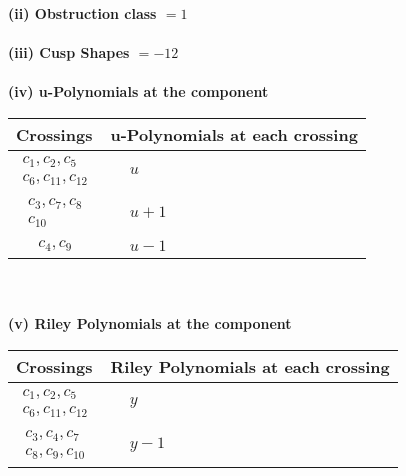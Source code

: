 \documentclass[1p]{elsarticle_modified}
\theoremstyle{definition}
\begin{document}
\flushleft \textbf{(ii) Obstruction class $= 1$}\\~\\
\flushleft \textbf{(iii) Cusp Shapes $= -12$}\\~\\
\newpage\renewcommand{\arraystretch}{1}
\flushleft \textbf{(iv) u-Polynomials at the component}\newline \\
\begin{tabular}{m{50pt}|m{274pt}}
Crossings & \hspace{64pt}u-Polynomials at each crossing \\
\hline $$\begin{aligned}c_{1},c_{2},c_{5}\\c_{6},c_{11},c_{12}\end{aligned}$$&$\begin{aligned}
&u
\end{aligned}$\\
\hline $$\begin{aligned}c_{3},c_{7},c_{8}\\c_{10}\end{aligned}$$&$\begin{aligned}
&u+1
\end{aligned}$\\
\hline $$\begin{aligned}c_{4},c_{9}\end{aligned}$$&$\begin{aligned}
&u-1
\end{aligned}$\\
\hline
\end{tabular}\\~\\
\newpage\renewcommand{\arraystretch}{1}
\flushleft \textbf{(v) Riley Polynomials at the component}\newline \\
\begin{tabular}{m{50pt}|m{274pt}}
Crossings & \hspace{64pt}Riley Polynomials at each crossing \\
\hline $$\begin{aligned}c_{1},c_{2},c_{5}\\c_{6},c_{11},c_{12}\end{aligned}$$&$\begin{aligned}
&y
\end{aligned}$\\
\hline $$\begin{aligned}c_{3},c_{4},c_{7}\\c_{8},c_{9},c_{10}\end{aligned}$$&$\begin{aligned}
&y-1
\end{aligned}$\\
\hline
\end{tabular}\\~\\
\end{document}
